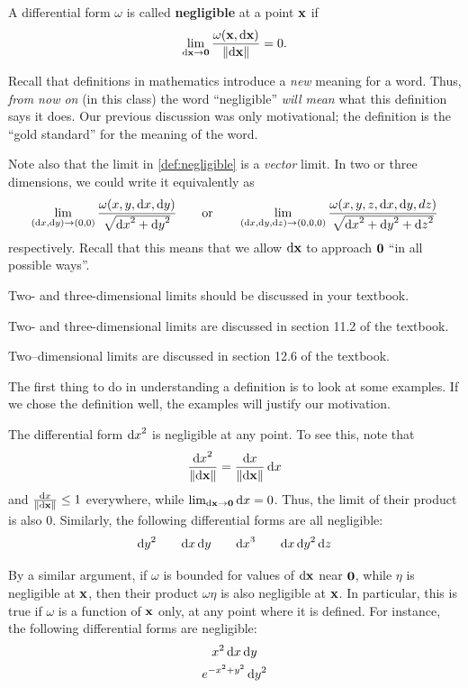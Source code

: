 \documentclass[12pt]{amsart}
\begin{document}
\begin{defn}\label{def:negligible}
  A differential form $\omega$ is called \textbf{negligible} at a point $\mathbf{x}$ if
  \[ \lim_{{\mathrm{d} \mathbf{x}}\to\mathbf{0}} \frac{\omega(\mathbf{x},{\mathrm{d} \mathbf{x}})}{\Vert {\ensuremath{\mathrm{d} \mathbf{x}}} \Vert} = 0. \]
\end{defn}

Recall that definitions in mathematics introduce a \emph{new} meaning for a word.
Thus, \emph{from now on} (in this class) the word ``negligible'' \emph{will mean} what this definition says it does.
Our previous discussion was only motivational; the definition is the ``gold standard'' for the meaning of the word.

Note also that the limit in \cref{def:negligible} is a \emph{vector} limit.
In two or three dimensions, we could write it equivalently as
\[ \lim_{({\mathrm{d} x},{\mathrm{d} y})\to(0,0)} \frac{\omega(x,y,{\mathrm{d} x},{\mathrm{d} y})}{\sqrt{{\mathrm{d} x}^2+{\mathrm{d} y}^2}} \qquad\text{or}\qquad
\lim_{({\mathrm{d} x},{\mathrm{d} y},{\mathrm{d} z})\to(0,0,0)} \frac{\omega(x,y,z,{\mathrm{d} x},{\mathrm{d} y},dz)}{\sqrt{{\mathrm{d} x}^2+{\mathrm{d} y}^2+{\mathrm{d} z}^2}}
\]
respectively.
Recall that this means that we allow ${\mathrm{d} \mathbf{x}}$ to approach $\mathbf{0}$ ``in all possible ways''.
\begin{notextbook}Two- and three-dimensional limits should be discussed in your textbook.\end{notextbook}%
\begin{stewart}Two- and three-dimensional limits are discussed in section 11.2 of the textbook.\end{stewart}
\begin{hugheshallett}Two--dimensional limits are discussed in section 12.6 of the textbook.\end{hugheshallett}

The first thing to do in understanding a definition is to look at some examples.
If we chose the definition well, the examples will justify our motivation.

\begin{eg}
  The differential form ${\mathrm{d} x}^2$ is negligible at any point.
  To see this, note that
  \[ \frac{{\mathrm{d} x}^2}{\Vert {\ensuremath{\mathrm{d} \mathbf{x}}} \Vert} = \frac{{\mathrm{d} x}}{\Vert {\ensuremath{\mathrm{d} \mathbf{x}}} \Vert} \,{\mathrm{d} x} \]
  and $\frac{{\mathrm{d} x}}{\Vert {\ensuremath{\mathrm{d} \mathbf{x}}} \Vert}\le 1$ everywhere, while $\lim_{{\mathrm{d} \mathbf{x}}\to\mathbf{0}} {\mathrm{d} x} = 0$.
  Thus, the limit of their product is also $0$.
  Similarly, the following differential forms are all negligible:
  \[ {\mathrm{d} y}^2 \qquad {\ensuremath{\mathrm{d} x}}\,{\mathrm{d} y} \qquad {\ensuremath{\mathrm{d} x}}^3 \qquad {\ensuremath{\mathrm{d} x}}\,{\mathrm{d} y}^2\,{\mathrm{d} z} \]
\end{eg}

\begin{eg}
  By a similar argument, if $\omega$ is bounded for values of ${\mathrm{d} \mathbf{x}}$ near $\mathbf{0}$, while $\eta$ is negligible at $\mathbf{x}$, then their product $\omega\eta$ is also negligible at $\mathbf{x}$.
  In particular, this is true if $\omega$ is a function of $\mathbf{x}$ only, at any point where it is defined.
  For instance, the following differential forms are negligible:
  \begin{gather*}
    x^2\,{\mathrm{d} x}\,{\mathrm{d} y}\\
    e^{-x^2+y^2} \,{\mathrm{d} y}^2
  \end{gather*}
\end{eg}
\end{document}
